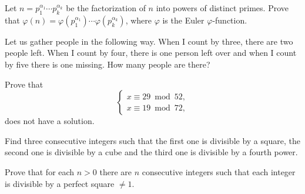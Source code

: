 \begin{bonus}
    Let $n=p_1^{\alpha_1}\cdots p_k^{\alpha_k}$ be the factorization 
    of $n$ into powers of distinct primes. Prove that 
    $\varphi(n)=\varphi(p_1^{\alpha_1})\cdots \varphi(p_k^{\alpha_k})$, where $\varphi$ is the Euler $\varphi$-function. 
\end{bonus}


%


\begin{bonus}
\label{xca:gather_people}
	Let us gather people in the following way. When I 
	count by three, there are two people left. 	When I count by four, 
	there is one person left over and when I count by five there is
	one missing. How many people are there?
\end{bonus}

\begin{bonus}
\label{xca:no_solution}
	Prove that 
	\[
	\begin{cases}
		x\equiv 29\bmod 52,\\
		x\equiv 19\bmod 72,
		\end{cases}
	\]
	does not have a solution.
\end{bonus}

\begin{bonus}
\label{xca:consecutive}
	Find three consecutive integers such that the first one is divisible by a square, 
	the second one is divisible by a cube and the third one is divisible by a fourth power. 	
\end{bonus}

\begin{bonus}
\label{xca:perfect_square}
	Prove that 
	for each $n>0$ there are $n$ consecutive integers such that 
	each integer is divisible by a perfect square $\ne 1$. 	
\end{bonus}

